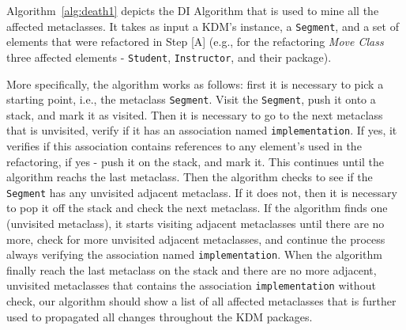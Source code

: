 Algorithm~\ref{alg:death1} depicts the DI Algorithm that is used to mine all the affected metaclasses. It takes as input a KDM's instance, a \texttt{Segment}, and a set of elements that were refactored in Step [A] (e.g., for the refactoring \textit{Move Class} three affected elements - \texttt{Student}, \texttt{Instructor}, and their package). %

More specifically, the algorithm works as follows: first it is necessary to pick a starting point, i.e., the metaclass \texttt{Segment}. Visit the \texttt{Segment}, push it onto a stack, and mark it as visited. Then it is necessary to go to the next metaclass that is unvisited, verify if it has an association named \texttt{implementation}. If yes, it verifies if this association contains references to any element's used in the refactoring, if yes - push it on the stack, and mark it. This continues until the algorithm reachs the last metaclass. Then the algorithm checks to see if the \texttt{Segment} has any unvisited adjacent metaclass. If it does not, then it is necessary to pop it off the stack and check the next metaclass. If the algorithm finds one (unvisited metaclass), it starts visiting adjacent metaclasses until there are no more, check for more unvisited adjacent metaclasses, and continue the process always verifying the association named \texttt{implementation}. When the algorithm finally reach the last metaclass on the stack and there are no more adjacent, unvisited metaclasses that contains the association \texttt{implementation} without check, our algorithm should show a list of all affected metaclasses that is further used to propagated all changes throughout the KDM packages. 
%
%
%
%
%
%
%
%
%












